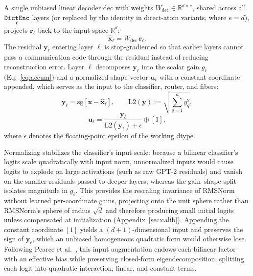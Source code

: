 A single unbiased linear decoder $\mathrm{dec}$ with weights
$W_{\mathrm{dec}} \in \mathbb{R}^{d \times e}$, shared across all
$\mathop{\mathtt{DictEnc}}\limits_\ell$ layers (or replaced by the identity in direct-atom
variants, where $e = d$), projects $\mathbf{r}_\ell$ back to the input
space $\mathbb{R}^d$:
\begin{equation}
	\hat{\mathbf{x}}_\ell = W_{\mathrm{dec}}\,\mathbf{r}_\ell.
	\label{eq:dec}
\end{equation}
The residual $\mathbf{y}_\ell$ entering layer $\ell$ is stop-gradiented
so that earlier layers cannot pass a communication code through the
residual instead of reducing reconstruction error. Layer $\ell$
decomposes $\mathbf{y}_\ell$ into the scalar gain $g_\ell$
(Eq.~\eqref{eq:accum}) and a normalized shape vector $\mathbf{u}_\ell$
with a constant coordinate appended, which serves as the input to the
classifier, router, and fibers:
\begin{equation}
	\mathbf{y}_\ell = \mathrm{sg}\!\left[\mathbf{x} - \hat{\mathbf{x}}_\ell\right],
	\qquad
	\mathrm{L2}(\mathbf{y}) := \sqrt{\sum^{d}_{q=1} y_q^2},
	\label{eq:L2}
\end{equation}
\begin{equation}
	\mathbf{u}_\ell =
	\frac{\mathbf{y}_\ell}{\mathrm{L2}(\mathbf{y}_\ell) + \epsilon} \oplus [1],
	\label{eq:y_norm}
\end{equation}
where $\epsilon$ denotes the floating-point epsilon of the working dtype.

Normalizing stabilizes the classifier's input scale: because a bilinear
classifier's logits scale quadratically with input norm, unnormalized
inputs would cause logits to explode on large activations (such as raw
GPT-2 residuals) and vanish on the smaller residuals passed to deeper
layers, whereas the gain--shape split isolates magnitude in $g_\ell$.
This provides the rescaling invariance of RMSNorm~\cite{zhang2019rms}
without learned per-coordinate gains, projecting onto the unit sphere
rather than RMSNorm's sphere of radius $\sqrt{d}$ and therefore producing
small initial logits unless compensated at initialization
(Appendix~\ref{sec:calib}). Appending the constant coordinate $[1]$
yields a $(d+1)$-dimensional input and preserves the sign of
$\mathbf{y}_\ell$, which an unbiased homogeneous quadratic form would
otherwise lose. Following Pearce et al.~\cite{pearce2025}, this input
augmentation endows each bilinear factor with an effective bias while
preserving closed-form eigendecomposition, splitting each logit into
quadratic interaction, linear, and constant terms.

